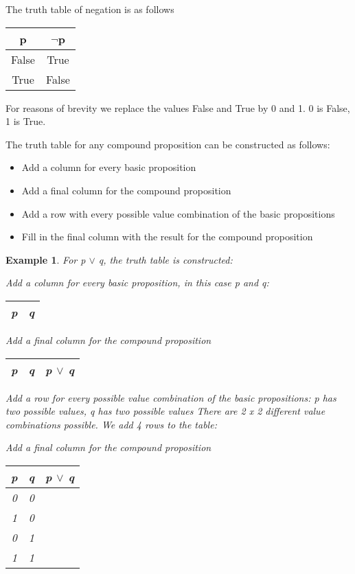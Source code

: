 \documentclass[10pt,a4paper,draft,titlepage,onecolumn]{book}
\newtheorem{example}{Example}[section]
\begin{document}
The truth table of negation is as follows 
\begin{center}
\begin{tabular}{ |c| c| }
 \hline
 p & {$\neg$}p \\
 \hline
 False & True \\ 
 True &  False \\
 \hline
\end{tabular}
\end{center}

For reasons of brevity we replace the values False and True by 0 and 1. 0 is False, 1 is True.


The truth table for any compound proposition can be constructed as follows:
\begin{itemize}
 \item Add a column for every basic proposition 
 \item Add a final column for the compound proposition
 \item Add a row with every possible value combination of the basic propositions
 \item Fill in the final column with the result for the compound proposition
\end{itemize}

\begin{example}
For p $\vee$ q, the truth table is constructed:

Add a column for every basic proposition, in this case p and q:
\begin{center}
\begin{tabular}{ |c| c| }
 \hline
 p & q \\
 \hline
\end{tabular}
\end{center}

Add a final column for the compound proposition
\begin{center}
\begin{tabular}{ |c|c|c| }
 \hline
 p & q &  p $\vee$ q  \\
 \hline
\end{tabular}
\end{center}

Add a row for every possible value combination of the basic propositions:
p has two possible values, q has two possible values 
There are 2 x 2 different value combinations possible. 
We add 4 rows to the table:

Add a final column for the compound proposition
\begin{center}
\begin{tabular}{ |c|c|c| }
 \hline
 p & q &  p $\vee$ q  \\
 \hline
 0 & 0 & \\
 1 & 0 & \\
 0 & 1 & \\
 1 & 1 & \\

 \hline
\end{tabular}
\end{center}



\end{example}
\end{document}
